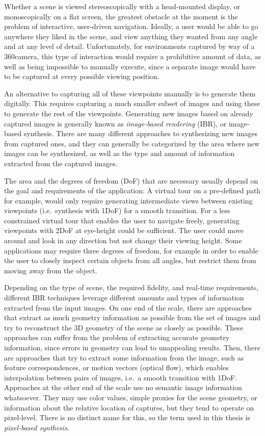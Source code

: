 Whether a scene is viewed stereoscopically with a head-mounted display, or monoscopically on a flat screen, the greatest obstacle at the moment is the problem of interactive, user-driven navigation. Ideally, a user would be able to go anywhere they liked in the scene, and view anything they wanted from any angle and at any level of detail. Unfortunately, for environments captured by way of a 360\degree camera, this type of interaction would require a prohibitive amount of data, as well as being impossible to manually execute, since a separate image would have to be captured at every possible viewing position.

An alternative to capturing all of these viewpoints manually is to generate them digitally. This requires capturing a much smaller subset of images and using these to generate the rest of the viewpoints. Generating new images based on already captured images is generally known as \emph{image-based rendering} (IBR), or image-based synthesis. There are many different approaches to synthesizing new images from captured ones, and they can generally be categorized by the area where new images can be synthesized, as well as the type and amount of information extracted from the captured images.

The area and the degrees of freedom (DoF) that are necessary usually depend on the goal and requirements of the application: A virtual tour on a pre-defined path for example, would only require generating intermediate views between existing viewpoints (i.e.\ synthesis with 1DoF) for a smooth transition. For a less constrained virtual tour that enables the user to navigate freely, generating viewpoints with 2DoF at eye-height could be sufficient. The user could move around and look in any direction but not change their viewing height. Some applications may require three degrees of freedom, for example in order to enable the user to closely inspect certain objects from all angles, but restrict them from moving away from the object.

Depending on the type of scene, the required fidelity, and real-time requirements, different IBR techniques leverage different amounts and types of information extracted from the input images. On one end of the scale, there are approaches that extract as much geometry information as possible from the set of images and try to reconstruct the 3D geometry of the scene as closely as possible. These approaches can suffer from the problem of extracting accurate geometry information, since errors in geometry can lead to unappealing results.
Then, there are approaches that try to extract some information from the image, such as feature correspondences, or motion vectors (optical flow), which enables interpolation between pairs of images, i.e.\ a smooth transition with 1DoF.
Approaches at the other end of the scale use no semantic image information whatsoever. They may use color values, simple proxies for the scene geometry, or information about the relative location of captures, but they tend to operate on pixel-level. There is no distinct name for this, so the term used in this thesis is \emph{pixel-based synthesis}.

